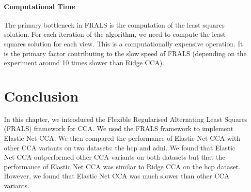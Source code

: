 \paragraph{Computational Time}\label{subsec:computational-time}

The primary bottleneck in FRALS is the computation of the least squares solution.
For each iteration of the algorithm, we need to compute the least squares solution for each view.
This is a computationally expensive operation.
It is the primary factor contributing to the slow speed of FRALS (depending on the experiment around 10 times slower than Ridge CCA).

\section{Conclusion}\label{sec:conclusion}

In this chapter, we introduced the Flexible Regularised Alternating Least Squares (FRALS) framework for CCA\@.
We used the FRALS framework to implement Elastic Net CCA\@.
We then compared the performance of Elastic Net CCA with other CCA variants on two datasets: the \acrshort{hcp} and \acrshort{adni}.
We found that Elastic Net CCA outperformed other CCA variants on both datasets but that the performance of Elastic Net CCA was similar to Ridge CCA on the \acrshort{hcp} dataset.
However, we found that Elastic Net CCA was much slower than other CCA variants.
